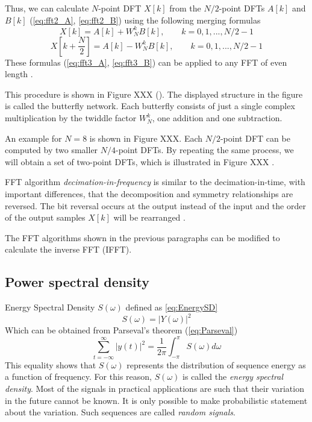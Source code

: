 \documentclass[twoside]{ctuthesis}
\theoremstyle{plain}
\theoremstyle{definition}
\theoremstyle{note}
\begin{document}
Thus, we can calculate $N$-point DFT $X[k]$ from the $N/2$-point DFTs $A[k]$ and $B[k]$ (\ref{eq:fft2_A}, \ref{eq:fft2_B}) using the following merging formulas
\begin{equation} \label{eq:fft3_A}
X[k]=A[k] + W^{k}_{N}B[k],\qquad k=0, 1, ..., N/2 -1
\end{equation}
\begin{equation} \label{eq:fft3_B}
X[k+\frac{N}{2}]=A[k] - W^{k}_{N}B[k],\qquad k=0, 1, ..., N/2 -1
\end{equation}
These formulas (\ref{eq:fft3_A}, \ref{eq:fft3_B}) can be applied to any FFT of even length \cite{cite:3}.

This procedure is shown in Figure XXX (\cite{cite:3}). The displayed structure in the figure is called the butterfly network. Each butterfly consists of just a single complex multiplication by the twiddle factor $W^{k}_{N}$, one addition and one subtraction. 

An example for $N=8$ is shown in Figure XXX. Each $N/2$-point DFT can be computed by two smaller $N/4$-point DFTs. By repeating the same process, we will obtain a set of two-point DFTs, which is illustrated in Figure XXX \cite{cite:RT_DSP}.

FFT algorithm \textit{decimation-in-frequency} is similar to the decimation-in-time, with important differences, that the decomposition and symmetry relationships are reversed. The bit reversal occurs at the output instead of the input and the order of the output samples $X[k]$ will be rearranged \cite{cite:RT_DSP}.

The FFT algorithms shown in the previous paragraphs can be modified to calculate the inverse FFT (IFFT).

\subsection{Power spectral density}
\label{sec:PSD}
Energy Spectral Density $S(\omega)$ defined as \ref{eq:EnergySD}
\begin{equation} \label{eq:EnergySD}
S(\omega)=\left|Y(\omega)\right|^2
\end{equation}
Which can be obtained from Parseval's theorem (\ref{eq:Parseval})
\begin{equation} \label{eq:Parseval}
\sum_{t=-\infty}^{\infty}\left|y(t)\right|^2 = \frac{1}{2\pi}\int_{-\pi}^{\pi}S(\omega)d\omega
\end{equation}
This equality shows that $S(\omega)$ represents the distribution of sequence energy as a function of frequency. For this reason, $S(\omega)$ is called the \textit{energy spectral density}. 
Most of the signals in practical applications are such that their variation in the future cannot be known. It is only possible to make probabilistic statement about the variation. Such sequences are called \textit{random signals}. 
\end{document}
